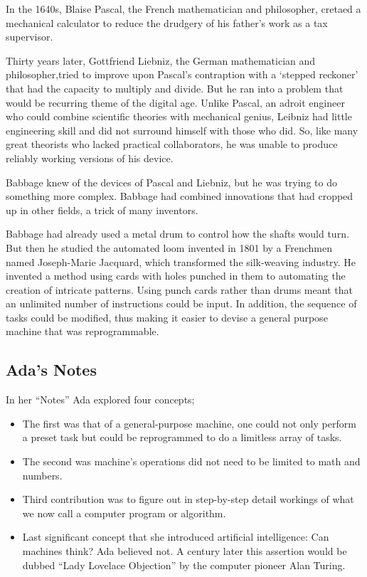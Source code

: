 In the 1640s, Blaise Pascal, the French mathematician and philosopher, cretaed a
mechanical calculator to reduce the drudgery of his father's work as a tax
supervisor.

Thirty years later, Gottfriend Liebniz, the German mathematician and
philosopher,tried to improve upon Pascal's contraption with a `stepped reckoner'
that had the capacity to multiply and divide. But he ran into a problem that
would be recurring theme of the digital age. Unlike Pascal, an adroit engineer
who could combine scientific theories with mechanical genius, Leibniz had little
engineering skill and did not surround himself with those who did. So, like many
great theorists who lacked practical collaborators, he was unable to produce
reliably working versions of his device.

Babbage knew of the devices of Pascal and Liebniz, but he was trying to do
something more complex. Babbage had combined innovations that had cropped up in
other fields, a trick of many inventors.

Babbage had already used a metal drum to control how the shafts would turn. But
then he studied the automated loom invented in 1801 by a Frenchmen named
Joseph-Marie Jacquard, which transformed the silk-weaving industry. He invented
a method using cards with holes punched in them to automating the creation of
intricate patterns. Using punch cards rather than drums meant that an unlimited
number of instructions could be input. In addition, the sequence of tasks could
be modified, thus making it easier to devise a general purpose machine that was
reprogrammable.

\subsection{Ada's Notes}

In her ``Notes'' Ada explored four concepts;

\begin{itemize}
\item The first was that of a general-purpose machine, one could not only perform a
preset task but could be reprogrammed  to do a limitless array of tasks.

\item The second was machine's operations did not need to be limited to math and
numbers.

\item Third contribution was to figure out in step-by-step detail workings of what we
now call a computer program or algorithm.

\item Last significant concept that she introduced artificial intelligence: Can
machines think? Ada believed not. A century later this assertion would be dubbed
``Lady Lovelace Objection'' by the computer pioneer Alan Turing.
\end{itemize}

